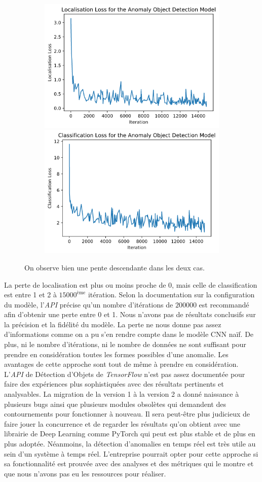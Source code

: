 \documentclass[french]{article}
\theoremstyle{mytheoremstyle}
\theoremstyle{mytheoremstyle}
\theoremstyle{myproblemstyle}
\begin{document}
    \begin{figure}[H]
        \centering
        \begin{subfigure}{\linewidth}
            \includegraphics[width=.5\textwidth]{images/od_loc_loss.png}
            \hfill
            \includegraphics[width=.5\textwidth]{images/od_cla_loss.png}
        \end{subfigure}
        \caption{On observe bien une pente descendante dans les deux cas.}
    \end{figure}
    
    
    La perte de localisation est plus ou moins proche de 0, mais celle de classification est entre 1 et 2 à $15000^{\text{ème}}$ itération. Selon la documentation sur la configuration du modèle, l'\emph{API} précise qu'un nombre d'itérations de $200000$ est recommandé afin d'obtenir une perte entre 0 et 1.
    \newline
    \indent Nous n'avons pas de résultats conclusifs sur la précision et la fidélité du modèle. La perte ne nous donne pas assez d'informations comme on a pu s'en rendre compte dans le modèle CNN naïf. De plus, ni le nombre d'itérations, ni le nombre de données ne sont suffisant pour prendre en considération toutes les formes possibles d'une anomalie. Les avantages de cette approche sont tout de même à prendre en considération. L'\emph{API} de Détection d'Objets de \textit{TensorFlow} n'est pas assez documentée pour faire des expériences plus sophistiquées avec des résultats pertinents et analysables. La migration de la version 1 à la version 2 a donné naissance à plusieurs bugs ainsi que plusieurs modules obsolètes qui demandent des contournements pour fonctionner à nouveau. Il sera peut-être plus judicieux de faire jouer la concurrence et de regarder les résultats qu'on obtient avec une librairie de Deep Learning comme PyTorch qui peut est plus stable et de plus en plus adoptée.
    \newline
    \indent Néanmoins, la détection d'anomalies en temps réel est très utile au sein d'un système à temps réel. L'entreprise pourrait opter pour cette approche si sa fonctionnalité est prouvée avec des analyses et des métriques qui le montre et que nous n'avons pas eu les ressources pour réaliser.
\end{document}
